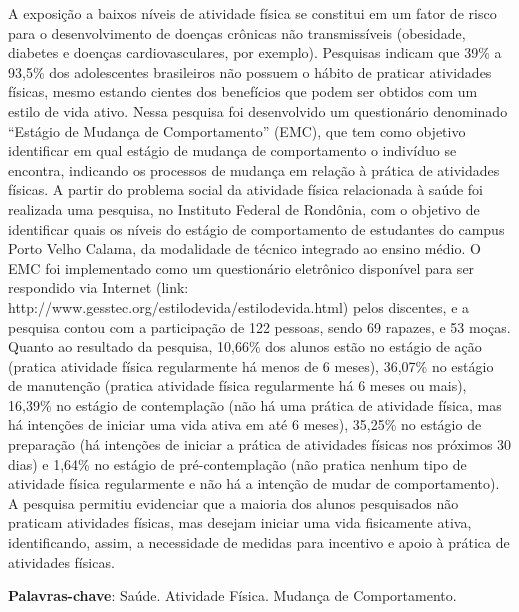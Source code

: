 \documentclass[article,12pt,onesidea,4paper,english,brazil]{abntex2}
\begin{document}
	\noindent A exposição a baixos níveis de atividade física se constitui em um fator de risco para
	o desenvolvimento de doenças crônicas não transmissíveis (obesidade, diabetes e
	doenças cardiovasculares, por exemplo). Pesquisas indicam que 39\% a 93,5\% dos
	adolescentes brasileiros não possuem o hábito de praticar atividades físicas, mesmo
	estando cientes dos benefícios que podem ser obtidos com um estilo de vida ativo.
	Nessa pesquisa foi desenvolvido um questionário denominado “Estágio de Mudança
	de Comportamento” (EMC), que tem como objetivo identificar em qual estágio de
	mudança de comportamento o indivíduo se encontra, indicando os processos de
	mudança em relação à prática de atividades físicas. A partir do problema social da
	atividade física relacionada à saúde foi realizada uma pesquisa, no Instituto Federal
	de Rondônia, com o objetivo de identificar quais os níveis do estágio de
	comportamento de estudantes do campus Porto Velho Calama, da modalidade de
	técnico integrado ao ensino médio. O EMC foi implementado como um questionário
	eletrônico disponível para ser respondido via Internet (link:
	http://www.gesstec.org/estilodevida/estilodevida.html) pelos discentes, e a pesquisa
	contou com a participação de 122 pessoas, sendo 69 rapazes, e 53 moças. Quanto
	ao resultado da pesquisa, 10,66\% dos alunos estão no estágio de ação (pratica
	atividade física regularmente há menos de 6 meses), 36,07\% no estágio de
	manutenção (pratica atividade física regularmente há 6 meses ou mais), 16,39\% no
	estágio de contemplação (não há uma prática de atividade física, mas há intenções
	de iniciar uma vida ativa em até 6 meses), 35,25\% no estágio de preparação (há
	intenções de iniciar a prática de atividades físicas nos próximos 30 dias) e 1,64\% no
	estágio de pré-contemplação (não pratica nenhum tipo de atividade física
	regularmente e não há a intenção de mudar de comportamento). A pesquisa permitiu
	evidenciar que a maioria dos alunos pesquisados não praticam atividades físicas,
	mas desejam iniciar uma vida fisicamente ativa, identificando, assim, a necessidade
	de medidas para incentivo e apoio à prática de atividades físicas.
	
	\vspace{\onelineskip}
	
	\noindent
	\textbf{Palavras-chave}: Saúde. Atividade Física. Mudança de Comportamento.
	
\end{document}
